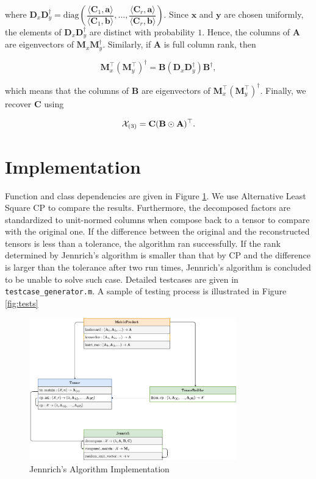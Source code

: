 where $\mathbf{D}_x \mathbf{D}_y^\dag = \mathrm{diag}\left(\dfrac{\langle \mathbf{C}_1, \mathbf{a} \rangle}{\langle \mathbf{C}_1, \mathbf{b} \rangle},\ldots, \dfrac{\langle \mathbf{C}_r, \mathbf{a} \rangle}{\langle \mathbf{C}_r, \mathbf{b} \rangle}\right)$. Since $\mathbf{x}$ and $\mathbf{y}$ are chosen uniformly, the elements of $\mathbf{D}_x \mathbf{D}_y^\dag$ are distinct with probability $1$. Hence, the columns of $\mathbf{A}$ are eigenvectors of $\mathbf{M}_x\mathbf{M}_y^\dag$. Similarly, if $\mathbf{A}$ is full column rank, then

\begin{equation}
    \mathbf{M}_x^\top (\mathbf{M}_y^\top)^\dag = \mathbf{B}(\mathbf{D}_x \mathbf{D}_y^\dag) \mathbf{B}^\dag,
\end{equation}

which means that the columns of $\mathbf{B}$ are eigenvectors of $\mathbf{M}_x^\top (\mathbf{M}_y^\top)^\dag$. Finally, we recover $\mathbf{C}$ using

\begin{equation}
    \mathcal{X}_{(3)} = \mathbf{C}(\mathbf{B}\odot \mathbf{A})^\top.
\end{equation}

\section{Implementation}
Function and class dependencies are given in Figure \ref{fig:jennrich}. We use Alternative Least Square CP to compare the results. Furthermore, the decomposed factors are standardized to unit-normed columns when compose back to a tensor to compare with the original one. If the difference between the original and the reconstructed tensors is less than a tolerance, the algorithm ran successfully. If the rank determined by Jennrich's algorithm is smaller than that by CP and the difference is larger than the tolerance after two run times, Jennrich's algorithm is concluded to be unable to solve such case. Detailed testcases are given in \texttt{testcase\_generator.m}. A sample of testing process is illustrated in Figure \ref{fig:tests}

\begin{figure}[ht]
    \centering
    \includegraphics[width=0.8\textwidth]{img/jennrich.png}
    \caption{Jennrich's Algorithm Implementation}
    \label{fig:jennrich}
\end{figure}


